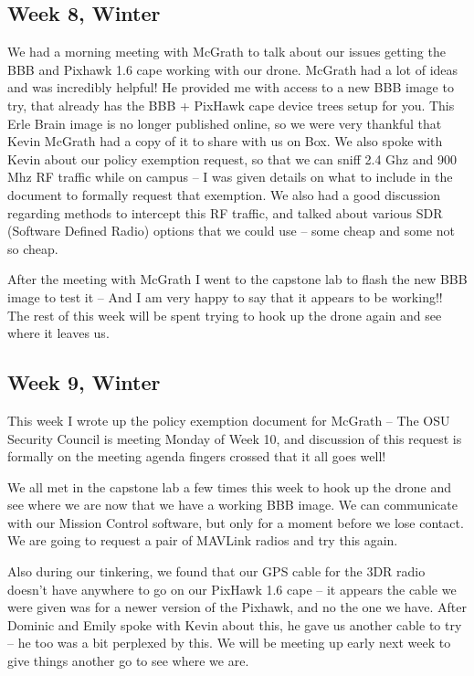 \documentclass[IEEEtran,letterpaper,10pt,notitlepage,draftclsnofoot,onecolumn]{article}
\begin{document}
                            \subsection{Week 8, Winter}
                            We had a morning meeting with McGrath to talk about our issues getting the BBB and Pixhawk 1.6 cape working with our drone. McGrath had a lot of ideas and was incredibly helpful! He provided me with access to a new BBB image to try, that already has the BBB + PixHawk cape device trees setup for you. This Erle Brain image is no longer published online, so we were very thankful that Kevin McGrath had a copy of it to share with us on Box. We also spoke with Kevin about our policy exemption request, so that we can sniff 2.4 Ghz and 900 Mhz RF traffic while on campus -- I was given details on what to include in the document to formally request that exemption. We also had a good discussion regarding methods to intercept this RF traffic, and talked about various SDR (Software Defined Radio) options that we could use -- some cheap and some not so cheap.

                            After the meeting with McGrath I went to the capstone lab to flash the new BBB image to test it -- And I am very happy to say that it appears to be working!! The rest of this week will be spent trying to hook up the drone again and see where it leaves us.
                            \subsection{Week 9, Winter}
                            This week I wrote up the policy exemption document for McGrath -- The OSU Security Council is meeting Monday of Week 10, and discussion of this request is formally on the meeting agenda fingers crossed that it all goes well!

                            We all met in the capstone lab a few times this week to hook up the drone and see where we are now that we have a working BBB image. We can communicate with our Mission Control software, but only for a moment before we lose contact. We are going to request a pair of MAVLink radios and try this again.

                            Also during our tinkering, we found that our GPS cable for the 3DR radio doesn't have anywhere to go on our PixHawk 1.6 cape -- it appears the cable we were given was for a newer version of the Pixhawk, and no the one we have. After Dominic and Emily spoke with Kevin about this, he gave us another cable to try -- he too was a bit perplexed by this. We will be meeting up early next week to give things another go to see where we are.
\end{document}
